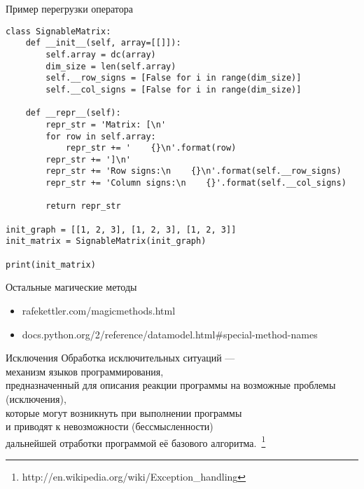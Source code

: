 \documentclass[hyperref={pdftex,unicode}]{beamer}
\begin{document}
\begin{frame}[fragile]{Пример перегрузки оператора}
    \begin{lstlisting}[basicstyle=\tiny\ttfamily]
class SignableMatrix:
    def __init__(self, array=[[]]):
        self.array = dc(array)
        dim_size = len(self.array)
        self.__row_signs = [False for i in range(dim_size)]
        self.__col_signs = [False for i in range(dim_size)]

    def __repr__(self):
        repr_str = 'Matrix: [\n'
        for row in self.array:
            repr_str += '    {}\n'.format(row)
        repr_str += ']\n'
        repr_str += 'Row signs:\n    {}\n'.format(self.__row_signs)
        repr_str += 'Column signs:\n    {}'.format(self.__col_signs)

        return repr_str

init_graph = [[1, 2, 3], [1, 2, 3], [1, 2, 3]]
init_matrix = SignableMatrix(init_graph)

print(init_matrix)
    \end{lstlisting}
\end{frame}

\begin{frame}{Остальные магические методы}
\begin{itemize}
  \item rafekettler.com/magicmethods.html
  \item \scriptsize{docs.python.org/2/reference/datamodel.html\#special-method-names}
\end{itemize}
\end{frame}


\begin{frame}{Исключения}
Обработка исключительных ситуаций --- \\
механизм языков программирования, \\
предназначенный для описания реакции программы на возможные проблемы (исключения), \\
которые могут возникнуть при выполнении программы \\
и приводят к невозможности (бессмысленности) \\
дальнейшей отработки программой её базового алгоритма.~\footnote[frame]{
http://en.wikipedia.org/wiki/Exception\_handling}
\end{frame}
\end{document}
